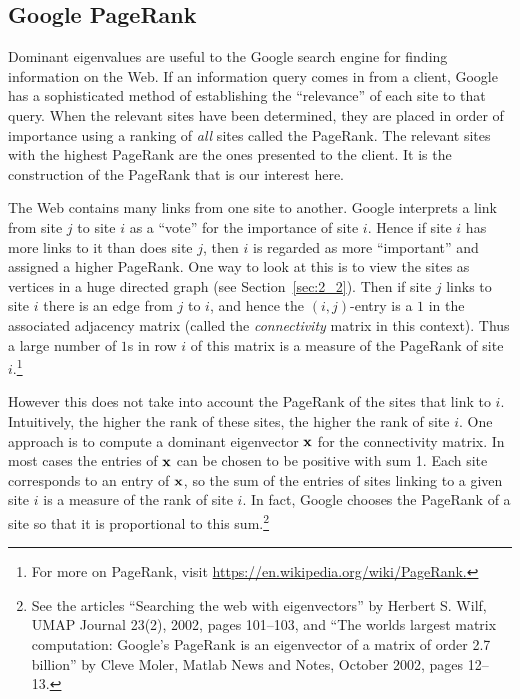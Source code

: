 \subsection*{Google PageRank}

Dominant
 eigenvalues are useful to the Google search engine for finding 
information on the Web. If an information query comes in from a client, 
Google has a sophisticated method of establishing the ``relevance'' of 
each site to that query. When the relevant sites have been determined, 
they are placed in order of importance using a ranking of \textit{all} 
sites called the PageRank. The relevant sites with the highest PageRank 
are the ones presented to the client. It is the construction of the 
PageRank that is our interest here.


The Web contains many links from one site to another. Google interprets a link from site $j$ to site $i$ as a ``vote'' for the importance of site $i$. Hence if site $i$ has more links to it than does site $j$, then $i$
 is regarded as more ``important'' and assigned a higher PageRank. One way
 to look at this is to view the sites as vertices in a huge directed 
graph (see Section~\ref{sec:2_2}). Then if site $j$ links to site $i$ there is an edge from $j$ to $i$, and hence the $(i, j)$-entry is a $1$ in the associated adjacency matrix (called the \textit{connectivity} matrix in this context). Thus a large number of $1$s in row $i$ of this matrix is a measure of the PageRank of site $i$.\footnote{For more on PageRank, visit \href{https://en.wikipedia.org/wiki/PageRank}{https://en.wikipedia.org/wiki/PageRank.}}



However this does not take into account the PageRank of the sites that link to $i$. Intuitively, the higher the rank of these sites, the higher the rank of site $i$. One approach is to compute a dominant eigenvector $\textbf{x}$ for the connectivity matrix. In most cases the entries of $\textbf{x}$ can be chosen to be positive with sum 1. Each site corresponds to an entry of $\textbf{x}$, so the sum of the entries of sites linking to a given site $i$ is a measure of the rank of site $i$. In fact, Google chooses the PageRank of a site so that it is proportional to this sum.\footnote{See
 the articles ``Searching the web with eigenvectors'' by Herbert S. Wilf, 
UMAP Journal 23(2), 2002, pages 101--103, and ``The worlds largest matrix 
computation: Google's PageRank is an eigenvector of a matrix of order 
2.7 billion'' by Cleve Moler, Matlab News and Notes, October 2002, pages 
12--13.}



